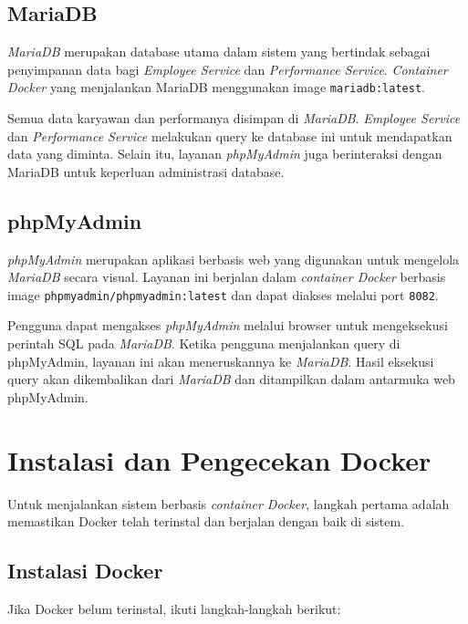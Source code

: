 \subsection{MariaDB}

\textit{MariaDB} merupakan database utama dalam sistem yang bertindak sebagai penyimpanan data bagi \textit{Employee Service} dan \textit{Performance Service}. \textit{Container Docker} yang menjalankan MariaDB menggunakan image \texttt{mariadb:latest}.

Semua data karyawan dan performanya disimpan di \textit{MariaDB}. \textit{Employee Service} dan \textit{Performance Service} melakukan query ke database ini untuk mendapatkan data yang diminta. Selain itu, layanan \textit{phpMyAdmin} juga berinteraksi dengan MariaDB untuk keperluan administrasi database.

\subsection{phpMyAdmin}

\textit{phpMyAdmin} merupakan aplikasi berbasis web yang digunakan untuk mengelola \textit{MariaDB} secara visual. Layanan ini berjalan dalam \textit{container Docker} berbasis image \texttt{phpmyadmin/\-phpmyadmin:\-latest} dan dapat diakses melalui port \texttt{8082}.

Pengguna dapat mengakses \textit{phpMyAdmin} melalui browser untuk mengeksekusi perintah SQL pada \textit{MariaDB}. Ketika pengguna menjalankan query di phpMyAdmin, layanan ini akan meneruskannya ke \textit{MariaDB}. Hasil eksekusi query akan dikembalikan dari \textit{MariaDB} dan ditampilkan dalam antarmuka web phpMyAdmin.


\section{Instalasi dan Pengecekan Docker}

Untuk menjalankan sistem berbasis \textit{container Docker}, langkah pertama adalah memastikan Docker telah terinstal dan berjalan dengan baik di sistem.

\subsection{Instalasi Docker}

Jika Docker belum terinstal, ikuti langkah-langkah berikut:

